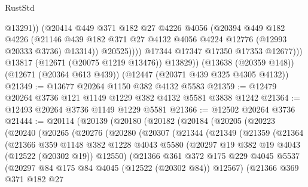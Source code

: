 \begin{lexlean}{RustStd}
\begin{coremodule}
                        @13291))
                    (@20414
                      @449
                      @371
                      @182
                      @27
                      @4226
                      @4056
                      (@20394
                        @449
                        @182
                        @4226
                        (@21146
                          @439
                          @182
                          @371
                          @27
                          @4132
                          @4056
                          @4224
                          @12776
                          (@12993 @20333 @3736)
                          @13314))
                      @20525))))
              @17344
              @17347
              @17350
              @17353
              @12677)))
        @13817
        (@12671 (@20075 @1219 @13476))
        @13829))
    (@13638 (@20359 @148))
    (@12671 (@20364 @613 @439))
    (@12447 (@20371 @439 @325 @4305 @4132))
@21349 := @13677 @20264 @1150 @382 @4132 @5583
@21359 := @12479 @20264 @3736 @121 @1149 @1229 @382 @4132 @5581 @3838 @1242
@21364 := @12493 @20264 @3736 @1149 @1229 @5581
@21366 := @12502 @20264 @3736
@21444 := @20114
    (@20139
      (@20180
        (@20182
          (@20184
            (@20205
              (@20223
                (@20240
                  (@20265
                    (@20276
                      (@20280
                        (@20307
                          (@21344
                            (@21349
                              (@21359
                                (@21364
                                  (@21366
                                    @359
                                    @1148
                                    @382
                                    @1228
                                    @4043
                                    @5580
                                    (@20297 @19 @382 @19 @4043 (@12522 (@20302 @19)) @12550)
                                    (@21366
                                      @361
                                      @372
                                      @175
                                      @229
                                      @4045
                                      @5537
                                      (@20297 @84 @175 @84 @4045 (@12522 (@20302 @84)) @12567)
                                      (@21366
                                        @369
                                        @371
                                        @182
                                        @27

\end{coremodule}
\end{lexlean}
